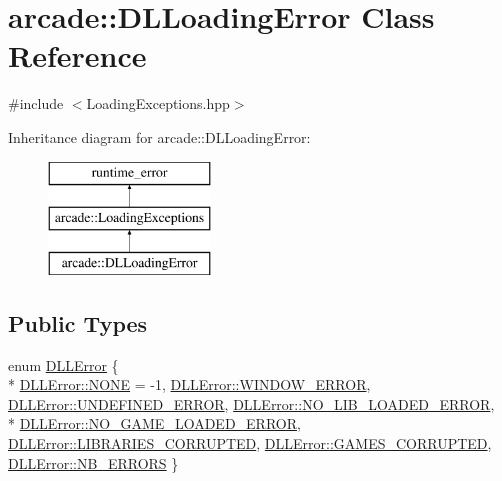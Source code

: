 \hypertarget{classarcade_1_1_d_l_loading_error}{\section{arcade\-:\-:D\-L\-Loading\-Error Class Reference}
\label{classarcade_1_1_d_l_loading_error}
}


{\ttfamily \#include $<$Loading\-Exceptions.\-hpp$>$}

Inheritance diagram for arcade\-:\-:D\-L\-Loading\-Error\-:\begin{figure}[H]
\begin{center}
\leavevmode
\includegraphics[height=3.000000cm]{classarcade_1_1_d_l_loading_error}
\end{center}
\end{figure}
\subsection*{Public Types}
\begin{DoxyCompactItemize}
\item 
enum \hyperlink{classarcade_1_1_d_l_loading_error_a84cd98868dfc8c4a27e8e524919778ab}{D\-L\-L\-Error} \{ \\*
\hyperlink{classarcade_1_1_d_l_loading_error_a84cd98868dfc8c4a27e8e524919778abab50339a10e1de285ac99d4c3990b8693}{D\-L\-L\-Error\-::\-N\-O\-N\-E} = -\/1, 
\hyperlink{classarcade_1_1_d_l_loading_error_a84cd98868dfc8c4a27e8e524919778abae599a3438b27a98c59417731d17a8d4c}{D\-L\-L\-Error\-::\-W\-I\-N\-D\-O\-W\-\_\-\-E\-R\-R\-O\-R}, 
\hyperlink{classarcade_1_1_d_l_loading_error_a84cd98868dfc8c4a27e8e524919778aba64b5ff8c8d580d70785998f54a4f7289}{D\-L\-L\-Error\-::\-U\-N\-D\-E\-F\-I\-N\-E\-D\-\_\-\-E\-R\-R\-O\-R}, 
\hyperlink{classarcade_1_1_d_l_loading_error_a84cd98868dfc8c4a27e8e524919778aba001aafee4176b739ac23b7b04dbeaae9}{D\-L\-L\-Error\-::\-N\-O\-\_\-\-L\-I\-B\-\_\-\-L\-O\-A\-D\-E\-D\-\_\-\-E\-R\-R\-O\-R}, 
\\*
\hyperlink{classarcade_1_1_d_l_loading_error_a84cd98868dfc8c4a27e8e524919778abaa270d41a3f4560fe9af3a9fb2ee416e2}{D\-L\-L\-Error\-::\-N\-O\-\_\-\-G\-A\-M\-E\-\_\-\-L\-O\-A\-D\-E\-D\-\_\-\-E\-R\-R\-O\-R}, 
\hyperlink{classarcade_1_1_d_l_loading_error_a84cd98868dfc8c4a27e8e524919778abaafd6451b33739d069d764c57c1ade386}{D\-L\-L\-Error\-::\-L\-I\-B\-R\-A\-R\-I\-E\-S\-\_\-\-C\-O\-R\-R\-U\-P\-T\-E\-D}, 
\hyperlink{classarcade_1_1_d_l_loading_error_a84cd98868dfc8c4a27e8e524919778aba1839c3562e7706fc0f0b66eefc49c10e}{D\-L\-L\-Error\-::\-G\-A\-M\-E\-S\-\_\-\-C\-O\-R\-R\-U\-P\-T\-E\-D}, 
\hyperlink{classarcade_1_1_d_l_loading_error_a84cd98868dfc8c4a27e8e524919778aba9aae426555853757f4bea337960fcc3b}{D\-L\-L\-Error\-::\-N\-B\-\_\-\-E\-R\-R\-O\-R\-S}
 \}
\end{DoxyCompactItemize}
